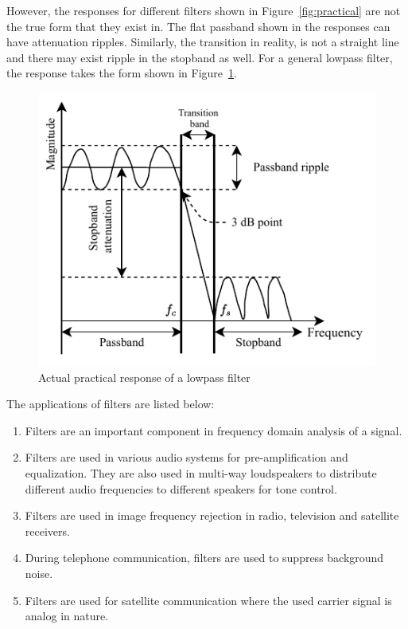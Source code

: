 However, the responses for different filters shown in Figure~\ref{fig:practical} are not the true form that they exist in. The flat passband shown in the responses can have attenuation ripples. Similarly, the transition in reality, is not a straight line and there may exist ripple in the stopband as well. For a general lowpass filter, the response takes the form shown in Figure~\ref{fig:practical-true}.
\begin{figure}[H]
    \centering
    \includegraphics[scale=1.2]{../Figures/practical}
    \caption{Actual practical response of a lowpass filter}
    \label{fig:practical-true}
\end{figure}

The applications of filters are listed below:
\begin{enumerate}
    \item Filters are an important component in frequency domain analysis of a signal.
    \item Filters are used in various audio systems for pre-amplification and equalization. They are also used in multi-way loudspeakers to distribute different audio frequencies to different speakers for tone control.
    \item Filters are used in image frequency rejection in radio, television and satellite receivers.
    \item During telephone communication, filters are used to suppress background noise.
    \item Filters are used for satellite communication where the used carrier signal is analog in nature.
\end{enumerate}